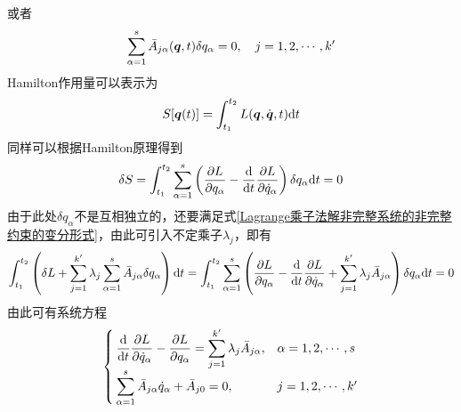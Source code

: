 或者
\begin{align}
	\sum_{\alpha=1}^s \bar{A}_{j\alpha}(\boldsymbol{q},t) \delta q_\alpha = 0,\quad j=1,2,\cdots,k'
	\label{Lagrange乘子法解非完整系统的非完整约束的变分形式}
\end{align}
Hamilton作用量可以表示为
\begin{equation*}
	S[\boldsymbol{q}(t)] = \int_{t_1}^{t_2} L(\boldsymbol{q},\dot{\boldsymbol{q}},t) \mathrm{d} t
\end{equation*}
同样可以根据Hamilton原理得到
\begin{equation*}
	\delta S = \int_{t_1}^{t_2} \sum_{\alpha=1}^s \left(\frac{\partial L}{\partial q_\alpha} - \frac{\mathrm{d}}{\mathrm{d} t} \frac{\partial L}{\partial \dot{q}_\alpha}\right) \delta q_\alpha \mathrm{d} t = 0
\end{equation*}
由于此处$\delta q_\alpha$不是互相独立的，还要满足式\eqref{Lagrange乘子法解非完整系统的非完整约束的变分形式}，由此可引入不定乘子$\lambda_j$，即有
\begin{align*}
	\int_{t_1}^{t_2} \left(\delta L + \sum_{j=1}^{k'} \lambda_j \sum_{\alpha=1}^s \bar{A}_{j\alpha} \delta q_\alpha\right) \mathrm{d} t = \int_{t_1}^{t_2} \sum_{\alpha=1}^s \left(\frac{\partial L}{\partial q_\alpha} - \frac{\mathrm{d}}{\mathrm{d} t} \frac{\partial L}{\partial \dot{q}_\alpha} + \sum_{j=1}^{k'} \lambda_j \bar{A}_{j\alpha} \right) \delta q_\alpha \mathrm{d} t = 0
\end{align*}
由此可有系统方程
\begin{equation}
	\begin{cases}
		\displaystyle \frac{\mathrm{d}}{\mathrm{d} t} \frac{\partial L}{\partial \dot{q}_\alpha} - \frac{\partial L}{\partial q_\alpha} = \sum_{j=1}^{k'} \lambda_j \bar{A}_{j\alpha},& \alpha = 1,2,\cdots,s \\[1.5ex]
		\displaystyle \sum_{\alpha=1}^s \bar{A}_{j\alpha} \dot{q}_\alpha + \bar{A}_{j0} = 0,& j = 1,2,\cdots,k'
	\end{cases}
\end{equation}

